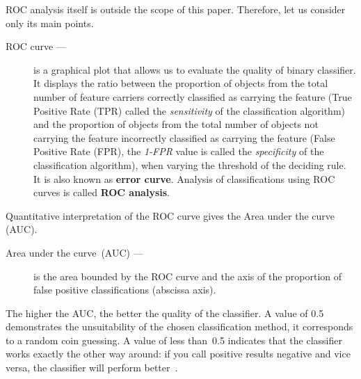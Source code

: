 \documentclass[]{scrreprt}
\begin{document}
ROC analysis itself is outside the scope of this paper. Therefore, let us consider only its main points.
\begin{description}
	\item[ROC curve ---] is a graphical plot that allows us to evaluate the quality of binary classifier. It displays the ratio between the proportion of objects from the total number of feature carriers correctly classified as carrying the feature (True Positive Rate (TPR) called the \emph{sensitivity} of the classification algorithm) and the proportion of objects from the total number of objects not carrying the feature incorrectly classified as carrying the feature (False Positive Rate (FPR), the \emph{1-FPR} value is called the \emph{specificity} of the classification algorithm), when varying the threshold of the deciding rule. It is also known as \textbf{error curve}. Analysis of classifications using ROC curves is called \textbf{ROC analysis}.
\end{description}
Quantitative interpretation of the ROC curve gives the Area under the curve (AUC).
\begin{description}
	\item[Area under the curve~(AUC) ---] is the area bounded by the ROC curve and the axis of the proportion of false positive classifications (abscissa axis).
\end{description}
The higher the AUC, the better the quality of the classifier. A value of 0.5 demonstrates the unsuitability of the chosen classification method, it corresponds to a random coin guessing. A value of less than~0.5 indicates that the classifier works exactly the other way around: if you call positive results negative and vice versa, the classifier will perform better~\cite{Wiki:ROC}.
\end{document}
